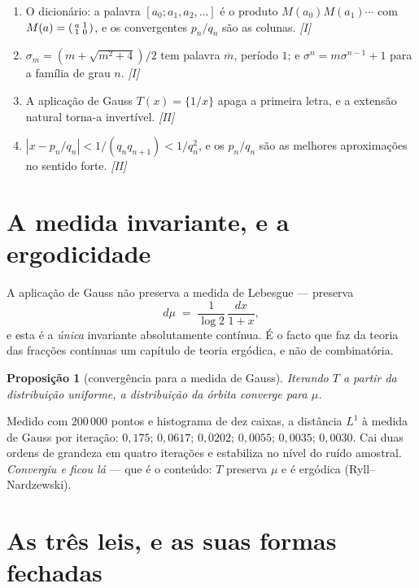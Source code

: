 \documentclass[11pt,a4paper]{article}
\theoremstyle{plain}
\newtheorem{proposicao}[teorema]{Proposição}
\theoremstyle{definition}
\theoremstyle{remark}
\begin{document}
\begin{enumerate}\itemsep3pt
\item[\textbf{(A1)}] O dicionário: a palavra $[a_0;a_1,a_2,\dots]$ é o produto
$M(a_0)M(a_1)\cdots$ com $M(a) = \begin{psmallmatrix}a&1\\1&0\end{psmallmatrix}$, e os convergentes
$p_n/q_n$ são as colunas. \emph{[I]}
\item[\textbf{(A2)}] $\sigma_m = (m+\sqrt{m^2+4})/2$ tem palavra $\overline{m}$, período $1$; e
$\sigma^n = m\sigma^{n-1}+1$ para a família de grau $n$. \emph{[I]}
\item[\textbf{(T1)}] A aplicação de Gauss $T(x) = \{1/x\}$ apaga a primeira letra, e a extensão
natural torna-a invertível. \emph{[II]}
\item[\textbf{(T2)}] $|x - p_n/q_n| < 1/(q_nq_{n+1}) < 1/q_n^2$, e os $p_n/q_n$ são as melhores
aproximações no sentido forte. \emph{[II]}
\end{enumerate}

\section{A medida invariante, e a ergodicidade}\label{sec:medida}

A aplicação de Gauss não preserva a medida de Lebesgue --- preserva
\[
  d\mu \;=\; \frac{1}{\log 2}\,\frac{dx}{1+x} ,
\]
e esta é a \emph{única} invariante absolutamente contínua. É o facto que faz da teoria das fracções
contínuas um capítulo de teoria ergódica, e não de combinatória.

\begin{proposicao}[convergência para a medida de Gauss]\label{prop:gauss}
Iterando $T$ a partir da distribuição uniforme, a distribuição da órbita converge para $\mu$.
\end{proposicao}

\noindent Medido com $200\,000$ pontos e histograma de dez caixas, a distância $L^1$ à medida de
Gauss por iteração: $0{,}175$; $0{,}0617$; $0{,}0202$; $0{,}0055$; $0{,}0035$; $0{,}0030$. Cai duas
ordens de grandeza em quatro iterações e estabiliza no nível do ruído amostral. \emph{Convergiu e
ficou lá} --- que é o conteúdo: $T$ preserva $\mu$ e é ergódica (Ryll--Nardzewski).

\section{As três leis, e as suas formas fechadas}\label{sec:leis}
\end{document}
